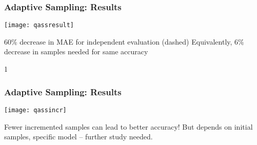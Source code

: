 \begin{frame}
    \frametitle{Adaptive Sampling: Results}
    \vspace{-10pt}
    \begin{center}
    \texttt{[image: qassresult]}
    \end{center}
    
    $60\%$ decrease in MAE for independent evaluation (dashed) \newline
    Equivalently, $6\%$ decrease in samples needed for same accuracy

\end{frame}
1

\begin{frame}
    \frametitle{Adaptive Sampling: Results}
    \vspace{-10pt}
    \begin{center}
    \texttt{[image: qassincr]}
    \end{center}
    
    Fewer incremented samples can lead to better accuracy! \newline
    But depends on initial samples, specific model -- further study needed.

\end{frame}
